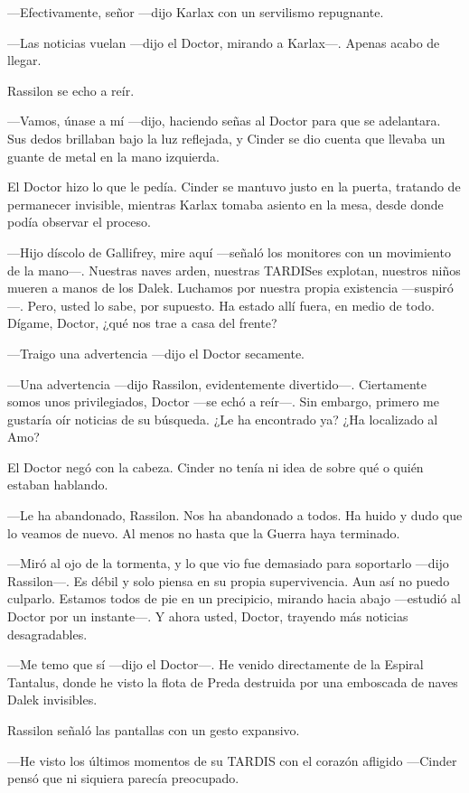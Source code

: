 —Efectivamente, señor —dijo Karlax con un servilismo repugnante.

—Las noticias vuelan —dijo el Doctor, mirando a Karlax—. Apenas acabo de llegar.

Rassilon se echo a reír. 

—Vamos, únase a mí —dijo, haciendo señas al Doctor para que se adelantara. Sus dedos brillaban bajo la luz reflejada, y Cinder se dio cuenta que llevaba un guante de metal en la mano izquierda.

El Doctor hizo lo que le pedía. Cinder se mantuvo justo en la puerta, tratando de permanecer invisible, mientras Karlax tomaba asiento en la mesa, desde donde podía observar el proceso.

—Hijo díscolo de Gallifrey, mire aquí —señaló los monitores con un movimiento de la mano—. Nuestras naves arden, nuestras TARDISes explotan, nuestros niños mueren a manos de los Dalek. Luchamos por nuestra propia existencia —suspiró—. Pero, usted lo sabe, por supuesto. Ha estado allí fuera, en medio de todo. Dígame, Doctor, ¿qué nos trae a casa del frente?

—Traigo una advertencia —dijo el Doctor secamente.

—Una advertencia —dijo Rassilon, evidentemente divertido—. Ciertamente somos unos privilegiados, Doctor —se echó a reír—. Sin embargo, primero me gustaría oír noticias de su búsqueda. ¿Le ha encontrado ya? ¿Ha localizado al Amo?

El Doctor negó con la cabeza. Cinder no tenía ni idea de sobre qué o quién estaban hablando. 

—Le ha abandonado, Rassilon. Nos ha abandonado  a todos. Ha huido y dudo que lo veamos de nuevo. Al menos no hasta que la Guerra haya terminado.

—Miró al ojo de la tormenta, y lo que vio fue demasiado para soportarlo —dijo Rassilon—. Es débil y solo piensa en su propia supervivencia. Aun así no puedo culparlo. Estamos todos de pie en un precipicio, mirando hacia abajo —estudió al Doctor por un instante—. Y ahora usted, Doctor, trayendo más noticias desagradables.

—Me temo que sí —dijo el Doctor—. He venido directamente de la Espiral Tantalus, donde he visto la flota de Preda destruida por una emboscada de naves Dalek invisibles.

Rassilon señaló las pantallas con un gesto expansivo. 

—He visto los últimos momentos de su TARDIS con el corazón afligido —Cinder pensó que ni siquiera parecía preocupado.

